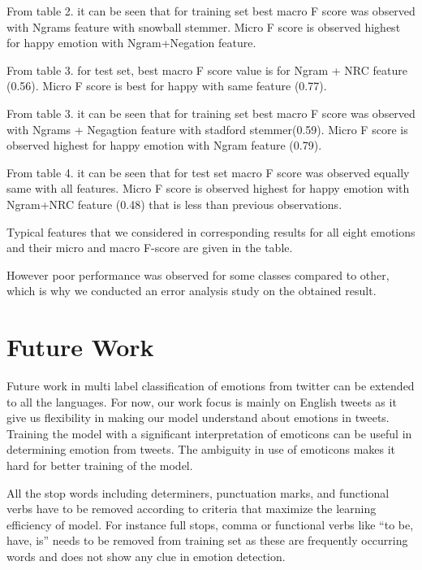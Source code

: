 \documentclass[11pt]{article}
\begin{document}
   
  From table 2. it can be seen that for training set best macro F score was observed with Ngrams feature with snowball stemmer. Micro F score is observed highest for happy emotion with Ngram+Negation feature. 
  
  From table 3. for test set, best macro F score value is for Ngram +  NRC feature (0.56). Micro F score is best for happy with same feature (0.77).
  
  From table 3. it can be seen that for training set best macro F score was observed with Ngrams + Negagtion feature with stadford stemmer(0.59). Micro F score is observed highest for happy emotion with Ngram feature (0.79). 
  
  From table 4. it can be seen that for test set  macro F score was observed equally same with all features. Micro F score is observed highest for happy emotion with Ngram+NRC feature (0.48) that is less than previous observations.
  
  
   
  
  
  
  Typical features that we considered in corresponding results for all eight
  emotions and their micro and macro F-score are given in the table.
  
  However poor performance was observed for some classes compared to other, which is why we conducted an error analysis study on the obtained result.
  
  
  \section{Future Work}
  
  Future work in multi label classification of emotions from twitter can be extended to all the languages. For now, our work focus is mainly on
  English tweets as it give us flexibility in making our model understand about emotions in tweets. Training the model with a significant interpretation
  of emoticons can be useful in determining emotion from tweets. The ambiguity in use of emoticons makes it hard for better training of the model.
  
  
  All the stop words including determiners, punctuation marks, and functional verbs have to be removed according to criteria that maximize the learning efficiency of model. For instance full stops, comma or functional verbs like “to be, have,
  is” needs to be removed from training set as these are frequently occurring words and does not show any clue in emotion detection.
  
\end{document}
